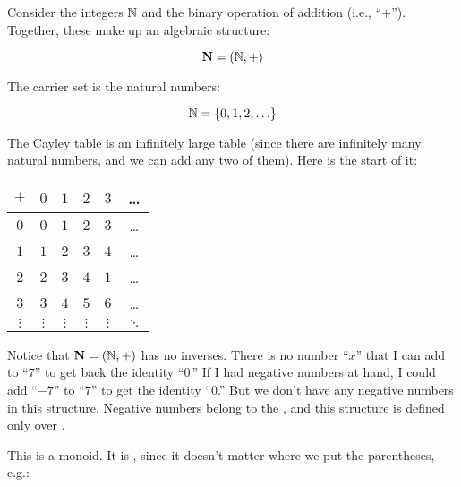 \documentclass[../../../main.tex]{subfiles}
\begin{document}
\begin{fexample}
\label{ex:nats-addition}

Consider the integers $\Nats/$ and the binary operation of addition (i.e., ``$+$''). Together, these make up an algebraic structure:

\begin{equation*}
  \algebra{N} = (\Nats/, +)
\end{equation*} 

The carrier set is the natural numbers:

\begin{equation*}
  \Nats/ = \{ 0, 1, 2, \ldots \}
\end{equation*}

The Cayley table is an infinitely large table (since there are infinitely many natural numbers, and we can add any two of them). Here is the start of it:

\begin{center}
  \begin{tabular}{| c || c | c | c | c | c |}
    \hline
    $+$      & $0$ & $1$ & $2$ & $3$ & \ldots \\ \hline \hline
    $0$      & $0$ & $1$ & $2$ & $3$ & \ldots \\ \hline
    $1$      & $1$ & $2$ & $3$ & $4$ & \ldots \\ \hline
    $2$      & $2$ & $3$ & $4$ & $1$ & \ldots \\ \hline
    $3$      & $3$ & $4$ & $5$ & $6$ & \ldots \\ \hline
    $\vdots$ & $\vdots$ & $\vdots$ & $\vdots$ & $\vdots$ & $\ddots$  \\ \hline
  \end{tabular}
\end{center}

\begin{aside}
  \begin{remark}
    Notice that $\algebra{N} = (\Nats/, +)$ has no inverses. There is no number ``$x$'' that I can add to ``$7$'' to get back the identity ``$0$.'' If I had negative numbers at hand, I could add ``$-7$'' to ``$7$'' to get the identity ``$0$.'' But we don't have any negative numbers in this structure. Negative numbers belong to the , and this structure is defined only over .
  \end{remark}
\end{aside}

This is a monoid. It is , since it doesn't matter where we put the parentheses, e.g.:


\end{fexample}
\end{document}
